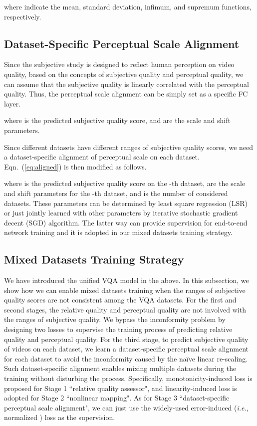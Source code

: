 \documentclass[twocolumn]{svjour3}          \smartqed  \usepackage{graphicx}
\begin{document}
where  indicate the mean, standard deviation, infimum, and supremum functions, respectively. 


\subsection{Dataset-Specific Perceptual Scale Alignment}
Since the subjective study is designed to reflect human perception on video quality, based on the concepts of subjective quality and perceptual quality, we can assume that the subjective quality is linearly correlated with the perceptual quality.
Thus, the perceptual scale alignment can be simply set as a specific FC layer.

where  is the predicted subjective quality score, and  are the scale and shift parameters. 

Since different datasets have different ranges of subjective quality scores, we need a dataset-specific alignment of perceptual scale on each dataset. Eqn.~(\ref{eq:aligned}) is then modified as follows.

where  is the predicted subjective quality score on the -th dataset,  are the scale and shift parameters for the -th dataset, and  is the number of considered datasets. 
These parameters can be determined by least square regression (LSR) or just jointly learned with other parameters by iterative stochastic gradient decent (SGD) algorithm. 
The latter way can provide supervision for end-to-end network training and it is adopted in our mixed datasets training strategy.



\subsection{Mixed Datasets Training Strategy}
We have introduced the unified VQA model in the above. 
In this subsection, we show how we can enable mixed datasets training when the ranges of subjective quality scores are not consistent among the VQA datasets. 
For the first and second stages, the relative quality and perceptual quality are not involved with the ranges of subjective quality.
We bypass the inconformity problem by designing two losses to supervise the training process of predicting relative quality and perceptual quality. 
For the third stage, to predict subjective quality of videos on each dataset, we learn a dataset-specific perceptual scale alignment for each dataset to avoid the inconformity caused by the na\"ive linear re-scaling.
Such dataset-specific alignment enables mixing multiple datasets during the training without disturbing the process. 
Specifically, monotonicity-induced loss is proposed for Stage 1 ``relative quality assessor", and linearity-induced loss is adopted for Stage 2 ``nonlinear mapping". 
As for Stage 3 ``dataset-specific perceptual scale alignment", we can just use the widely-used error-induced (\textit{i.e.}, normalized ) loss as the supervision.
\end{document}
